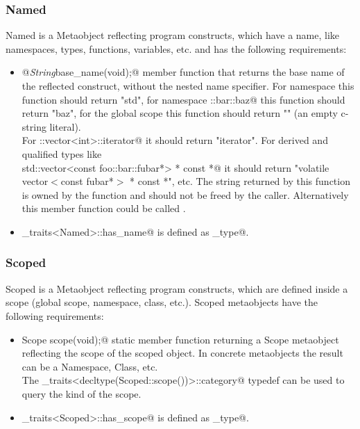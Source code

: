 \subsubsection{Named}

{\metaobject Named} is a {\metaobject Metaobject} reflecting program constructs,
which have a name, like namespaces, types, functions, variables, etc. and has
the following requirements:

\begin{itemize}

	\item{\verb@static @{\em String}\verb@ base_name(void);@} member function that returns the base name
	of the reflected construct, without the nested name specifier. For namespace
	\verb@std@ this function should return "std", for namespace \verb@foo::bar::baz@
	this function should return "baz", for the global scope this function
	should return "" (an empty c-string literal).\\For \verb@std::vector<int>::iterator@
	it should return "iterator". For derived and qualified types like \\
	\verb@volatile std::vector<const foo::bar::fubar*> * const *@ it should return
	"volatile vector$<$const fubar*$>$ * const *", etc. The string returned by this
	function is owned by the function and should not be freed by the caller. Alternatively 
	this member function could be called \verb@identifier@.
	

	\item \verb@metaobject_traits<Named>::has_name@ is defined as \verb@true_type@.
\end{itemize}

\subsubsection{Scoped}

{\metaobject Scoped} is a {\metaobject Metaobject} reflecting program constructs,
which are defined inside a scope (global scope, namespace, class, etc.). {\metaobject Scoped}
metaobjects have the following requirements:

\begin{itemize}
	\item{\verb@static Scope scope(void);@} static member function returning
	a {\metaobject Scope} metaobject reflecting the scope of the scoped object.
	In concrete metaobjects the result can be a {\metaobject Namespace}, {\metaobject Class},
	etc.\\The \verb@metaobject_traits<decltype(Scoped::scope())>::category@ typedef can be used to
	query the kind of the scope.

	\item \verb@metaobject_traits<Scoped>::has_scope@ is defined as \verb@true_type@.
\end{itemize}

